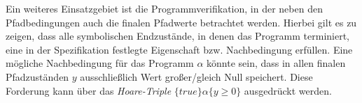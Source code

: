 Ein weiteres Einsatzgebiet ist die Programmverifikation, in der neben den Pfadbedingungen auch die finalen Pfadwerte betrachtet werden. Hierbei gilt es zu zeigen, dass alle symbolischen Endzustände, in denen das Programm terminiert, eine in der Spezifikation festlegte Eigenschaft bzw. Nachbedingung erfüllen. Eine mögliche Nachbedingung für das Programm $\alpha$ könnte sein, dass in allen finalen Pfadzuständen $y$ ausschließlich Wert großer/gleich Null speichert. Diese Forderung kann über das \emph{Hoare-Triple} $\{true\}\alpha\{y \geq 0\}$ ausgedrückt werden.
